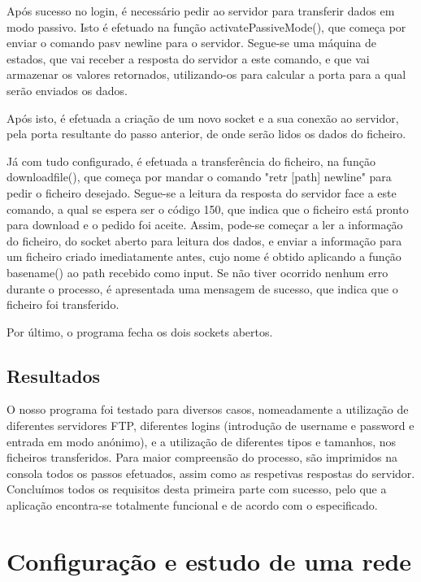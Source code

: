 \documentclass[article, a4paper, 11pt, oneside]{memoir}
\begin{document}
Após sucesso no login, é necessário pedir ao servidor para transferir dados em modo passivo. Isto é efetuado na função activatePassiveMode(), que começa por enviar o comando 
pasv newline para o servidor.
Segue-se uma máquina de estados, que vai receber a resposta do servidor a este comando, e que vai armazenar os valores retornados, 
utilizando-os para calcular a porta para a qual serão enviados os dados. 

Após isto, é efetuada a criação de um novo socket e a sua conexão ao servidor, 
pela porta resultante do passo anterior, de onde serão lidos os dados do ficheiro.

Já com tudo configurado, é efetuada a transferência do ficheiro, na função download\textunderscore file(), que começa por mandar
o comando "retr [path] newline" para pedir o ficheiro desejado. Segue-se a leitura da resposta do servidor face a este comando,
a qual se espera ser o código 150, que indica que o ficheiro está pronto para download e o pedido foi aceite. 
Assim, pode-se começar a ler a informação do ficheiro, do socket aberto para leitura dos dados, e enviar a informação para um ficheiro criado imediatamente antes,
cujo nome é obtido aplicando a função basename() ao path recebido como input. Se não tiver ocorrido nenhum erro durante o processo, é apresentada uma mensagem de sucesso,
que indica que o ficheiro foi transferido. 

Por último, o programa fecha os dois sockets abertos.

\section{Resultados}

O nosso programa foi testado para diversos casos, nomeadamente a utilização de diferentes servidores FTP,
diferentes logins (introdução de username e password e entrada em modo anónimo), e a utilização de diferentes tipos e tamanhos, nos ficheiros transferidos.
Para maior compreensão do processo, são imprimidos na consola todos os passos efetuados, assim como as respetivas respostas do servidor.
Concluímos todos os requisitos desta primeira parte com sucesso, pelo que a aplicação encontra-se totalmente funcional e de acordo com o especificado.

\newpage
\chapter[Configuração e estudo de uma rede][Configuração e estudo de uma rede]{Configuração e estudo de uma rede} \label{\thechapter}
\end{document}
